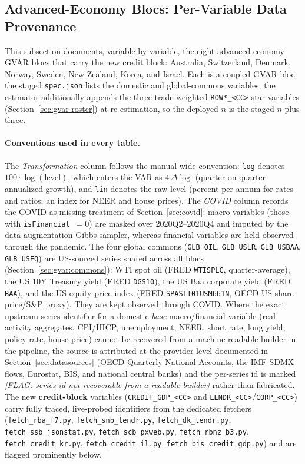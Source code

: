 \subsection{Advanced-Economy Blocs: Per-Variable Data Provenance}\label{sec:data:adv}

This subsection documents, variable by variable, the eight advanced-economy
GVAR blocs that carry the new credit block: Australia, Switzerland, Denmark,
Norway, Sweden, New Zealand, Korea, and Israel. Each is a coupled GVAR bloc:
the staged \texttt{spec.json} lists the domestic and global-commons variables;
the estimator additionally appends the three trade-weighted \texttt{ROW*\_<CC>}
star variables (Section~\ref{sec:gvar-roster}) at re-estimation, so the
deployed $n$ is the staged $n$ plus three.

\paragraph{Conventions used in every table.} The \emph{Transformation} column
follows the manual-wide convention: \texttt{log} denotes $100\cdot\log(\text{level})$,
which enters the VAR as $4\,\Delta\log$ (quarter-on-quarter annualized growth),
and \texttt{lin} denotes the raw level (percent per annum for rates and ratios;
an index for NEER and house prices). The \emph{COVID} column records the
COVID-as-missing treatment of Section~\ref{sec:covid}: macro variables
(those with \texttt{isFinancial}~$=0$) are masked over 2020Q2--2020Q4 and
imputed by the data-augmentation Gibbs sampler, whereas financial variables
are held observed through the pandemic. The four global commons
(\texttt{GLB\_OIL}, \texttt{GLB\_USLR}, \texttt{GLB\_USBAA}, \texttt{GLB\_USEQ})
are US-sourced series shared across all blocs
(Section~\ref{sec:gvar:commons}): WTI spot oil (FRED \texttt{WTISPLC},
quarter-average), the US 10Y Treasury yield (FRED \texttt{DGS10}), the US Baa
corporate yield (FRED \texttt{BAA}), and the US equity price index
(FRED \texttt{SPASTT01USM661N}, OECD US share-price/S\&P proxy). They are kept
observed through COVID. Where the exact upstream series identifier for a
domestic \emph{base} macro/financial variable (real-activity aggregates, CPI/HICP,
unemployment, NEER, short rate, long yield, policy rate, house price) cannot be
recovered from a machine-readable builder in the pipeline, the source is
attributed at the provider level documented in Section~\ref{sec:datasources}
(OECD Quarterly National Accounts, the IMF SDMX flows, Eurostat, BIS, and
national central banks) and the per-series id is marked
\textit{[FLAG: series id not recoverable from a readable builder]} rather than
fabricated. The new \textbf{credit-block} variables
(\texttt{CREDIT\_GDP\_<CC>} and \texttt{LENDR\_<CC>}/\texttt{CORP\_<CC>}) carry
fully traced, live-probed identifiers from the dedicated fetchers
(\texttt{fetch\_rba\_f7.py}, \texttt{fetch\_snb\_lendr.py},
\texttt{fetch\_dk\_lendr.py}, \texttt{fetch\_ssb\_jsonstat.py},
\texttt{fetch\_scb\_pxweb.py}, \texttt{fetch\_rbnz\_b3.py},
\texttt{fetch\_credit\_kr.py}, \texttt{fetch\_credit\_il.py},
\texttt{fetch\_bis\_credit\_gdp.py}) and are flagged prominently below.

